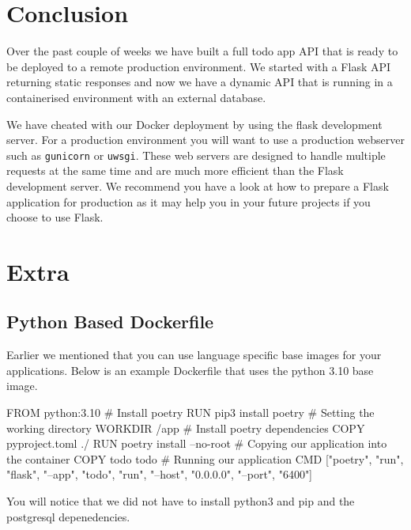 \documentclass{csse4400}
\begin{document}

\section{Conclusion}

Over the past couple of weeks we have built a full todo app API that is ready to be deployed to a remote production environment.
We started with a Flask API returning static responses and now we have a dynamic API that is running in a containerised environment with an external database.

We have cheated with our Docker deployment by using the flask development server.
For a production environment you will want to use a production webserver such as \texttt{gunicorn} or \texttt{uwsgi}.
These web servers are designed to handle multiple requests at the same time and are much more efficient than the Flask development server.
We recommend you have a look at how to prepare a Flask application for production as it may help you in your future projects if you choose to use Flask.

\section{Extra}

\subsection{Python Based Dockerfile}

Earlier we mentioned that you can use language specific base images for your applications. Below is an example Dockerfile that uses the python 3.10 base image.

\begin{code}[language=docker,numbers=none]{}
FROM python:3.10
# Install poetry
RUN pip3 install poetry
# Setting the working directory
WORKDIR /app
# Install poetry dependencies
COPY pyproject.toml ./
RUN poetry install --no-root
# Copying our application into the container
COPY todo todo
# Running our application
CMD ["poetry", "run", "flask", "--app", "todo", "run", "--host", "0.0.0.0", "--port", "6400"]
\end{code}

You will notice that we did not have to install python3 and pip and the postgresql depenedencies.

%
%
\end{document}
